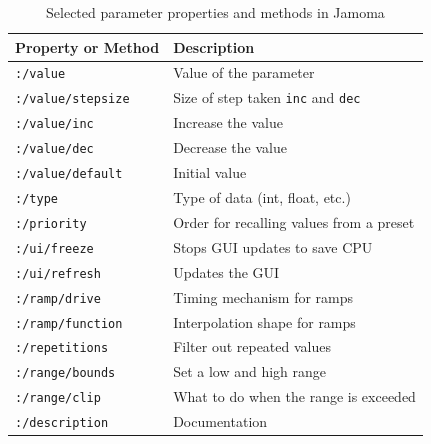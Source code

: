 \documentclass{article}
\begin{document}
\begin{table}
\begin{center}
\footnotesize\noindent
\begin{tabular}{| l | p{4.5cm} |}
    \hline
    \textbf{Property or Method}          & \textbf{Description}\\ 
	\hline
	\texttt{:/value}			& Value of the parameter \\
	\hline
	\texttt{:/value/stepsize}	& Size of step taken \texttt{inc} and \texttt{dec} \\
	\hline
	\texttt{:/value/inc}		& Increase the value \\
	\hline
	\texttt{:/value/dec}		& Decrease the value \\
	\hline
	\texttt{:/value/default}	& Initial value \\
	\hline
	\texttt{:/type} 			& Type of data (int, float, etc.) \\
	\hline
	\texttt{:/priority} 		& Order for recalling values from a preset \\
	\hline
	\texttt{:/ui/freeze} 		& Stops GUI updates to save CPU \\
	\hline
	\texttt{:/ui/refresh} 		& Updates the GUI \\
	\hline
	\texttt{:/ramp/drive} 		& Timing mechanism for ramps \\
	\hline
	\texttt{:/ramp/function} 	& Interpolation shape for ramps \\
	\hline
	\texttt{:/repetitions} 		& Filter out repeated values \\
	\hline
	\texttt{:/range/bounds} 	& Set a low and high range \\
	\hline
	\texttt{:/range/clip} 		& What to do when the range is exceeded \\
	\hline
	\texttt{:/description} 		& Documentation \\
	\hline
\end{tabular}
\end{center}
\caption{Selected parameter properties and methods in Jamoma}
\label{tab:parameter_properties}
\end{table}
\end{document}
